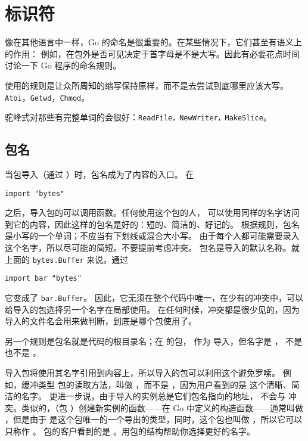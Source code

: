 \section{标识符}
像在其他语言中一样，Go 的命名是很重要的。在某些情况下，它们甚至有语义上的作用：
例如，在包外是否可见决定于首字母是不是大写。因此有必要花点时间讨论一下 Go 程序的命名规则。

使用的规则是让众所周知的缩写保持原样，而不是去尝试到底哪里应该大写。
\lstinline{Atoi}，\lstinline{Getwd}，\lstinline{Chmod}。

驼峰式对那些有完整单词的会很好：\lstinline{ReadFile，NewWriter，MakeSlice}。

\subsection{包名}
当包导入（通过 ）时，包名成为了内容的入口。
在 
\begin{lstlisting}
import "bytes"
\end{lstlisting}
之后，导入包的可以调用函数。任何使用这个包的人，
可以使用同样的名字访问到它的内容，因此这样的包名是好的：短的、简洁的、好记的。
根据规则，包名是小写的一个单词；不应当有下划线或混合大小写。
由于每个人都可能需要录入这个名字，所以尽可能的简短。不要提前考虑冲突。
包名是导入的默认名称。就上面的 \lstinline{bytes.Buffer} 来说。通过 
\begin{lstlisting}
import bar "bytes"
\end{lstlisting}
它变成了 \lstinline{bar.Buffer}。
因此，它无须在整个代码中唯一，在少有的冲突中，可以给导入的包选择另一个名字在局部使用。
在任何时候，冲突都是很少见的，因为导入的文件名会用来做判断，到底是哪个包使用了。

另一个规则是包名就是代码的根目录名；在  的包，
作为  导入，但名字是 ，
不是  也不是 。

导入包将使用其名字引用到内容上，所以导入的包可以利用这个避免罗嗦。
例如，缓冲类型  包的读取方法，叫做 ，而不是
，因为用户看到的是  这个清晰、简洁的名字。
更进一步说，由于导入的实例总是它们包名指向的地址， 不会与
 冲突。类似的，（包 ）创建新实例的函数——在 Go 中定义的构造函数——通常叫做
，但是由于  是这个包唯一的一个导出的类型，同时，这个包也叫做
，所以它可以只称作 。
包的客户看到的是 。用包的结构帮助你选择更好的名字。

